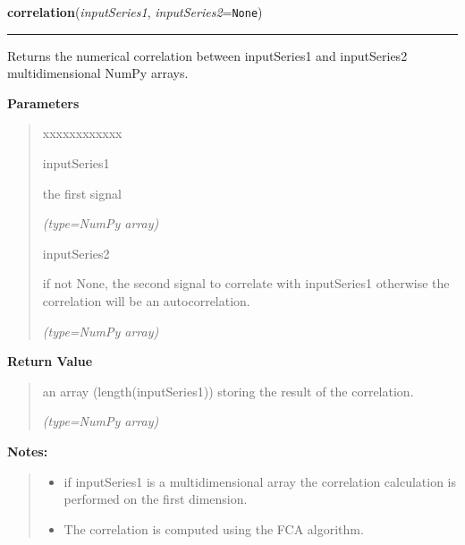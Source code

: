 \hspace{.8\funcindent}\begin{boxedminipage}{\funcwidth}

    \raggedright \textbf{correlation}(\textit{inputSeries1}, \textit{inputSeries2}={\tt None})

    \vspace{-1.5ex}

    \rule{\textwidth}{0.5\fboxrule}
\setlength{\parskip}{2ex}
    Returns the numerical correlation between 
    {\textbar}inputSeries1{\textbar} and {\textbar}inputSeries2{\textbar} 
    multidimensional NumPy arrays.

\setlength{\parskip}{1ex}
      \textbf{Parameters}
      \vspace{-1ex}

      \begin{quote}
        \begin{Ventry}{xxxxxxxxxxxx}

          \item[inputSeries1]

          the first signal

            {\it (type=NumPy array)}

          \item[inputSeries2]

          if not None, the second signal to correlate with 
          {\textbar}inputSeries1{\textbar} otherwise the correlation will 
          be an autocorrelation.

            {\it (type=NumPy array)}

        \end{Ventry}

      \end{quote}

      \textbf{Return Value}
    \vspace{-1ex}

      \begin{quote}
      an array (length({\textbar}inputSeries1{\textbar})) storing the 
      result of the correlation.

      {\it (type=NumPy array)}

      \end{quote}

\textbf{Notes:}
\begin{quote}
  \begin{itemize}

  \item
    \setlength{\parskip}{0.6ex}
if {\textbar}inputSeries1{\textbar} is a multidimensional array the 
correlation calculation is performed on the first dimension.



  \item The correlation is computed using the FCA algorithm.



\end{itemize}

\end{quote}

    \end{boxedminipage}

